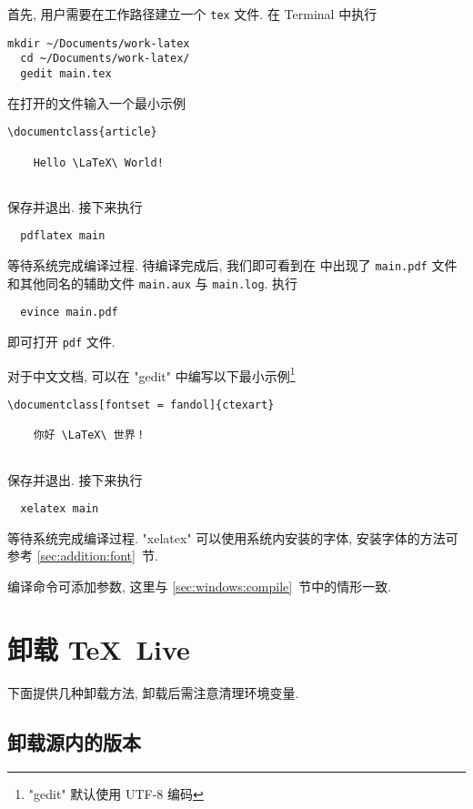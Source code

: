 首先, 用户需要在工作路径建立一个 \texttt{tex} 文件.
在 \textsf{Terminal} 中执行
\begin{lstlisting}[deletekeywords = tex]
  mkdir ~/Documents/work-latex
  cd ~/Documents/work-latex/
  gedit main.tex
\end{lstlisting}
在打开的文件输入一个最小示例
\begin{lstlisting}[language = mwe]
  \documentclass{article}
  
    Hello \LaTeX\ World!
  
\end{lstlisting}
保存并退出.
接下来执行
\begin{lstlisting}
  pdflatex main
\end{lstlisting}
等待系统完成编译过程.
待编译完成后,
我们即可看到在  中出现了
\texttt{main.pdf} 文件和其他同名的辅助文件 \texttt{main.aux} 与
\texttt{main.log}.
执行
\begin{lstlisting}
  evince main.pdf
\end{lstlisting}
即可打开 \texttt{pdf} 文件.

对于中文文档, 可以在 "gedit" 中编写以下最小示例\footnote{"gedit" 默认使用 UTF-8 编码}%
\begin{lstlisting}[language = mwe]
  \documentclass[fontset = fandol]{ctexart}
  
    你好 \LaTeX\ 世界！
  
\end{lstlisting}
保存并退出.
接下来执行
\begin{lstlisting}
  xelatex main
\end{lstlisting}
等待系统完成编译过程.
"xelatex" 可以使用系统内安装的字体,
安装字体的方法可参考 \ref{sec:addition:font}~节.

编译命令可添加参数, 这里与 \ref{sec:windows:compile}~节中的情形一致.

\section{卸载 \TeX~Live}\label{sec:ubuntu:uninstall}

下面提供几种卸载方法,
卸载后需注意清理环境变量.

\subsection{卸载源内的版本}\label{sec:ubuntu:aptremove}

